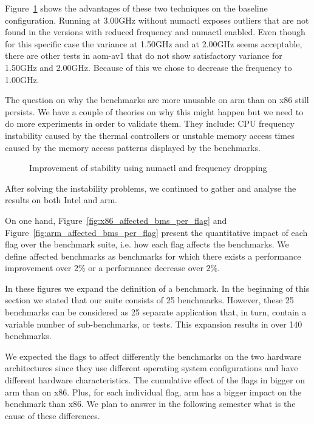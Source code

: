 Figure~\ref{fig:EncoderModeSpeed11RealtimeInputBosphorus4K} shows the advantages
of these two techniques on the baseline configuration. Running at 3.00GHz
without numactl exposes outliers that are not found in the versions with reduced
frequency and numactl enabled. Even though for this specific case the variance
at 1.50GHz and at 2.00GHz seems acceptable, there are other tests in aom-av1
that do not show satisfactory variance for 1.50GHz and 2.00GHz. Because of this
we chose to decrease the frequency to 1.00GHz.

The question on why the benchmarks are more unusable on arm than on x86 still
persists. We have a couple of theories on why this might happen but we need to
do more experiments in order to validate them. They include: CPU frequency
instability caused by the thermal controllers or unstable memory access times
caused by the memory access patterns displayed by the benchmarks. 

\begin{figure}[H]
  \centering
  
  \caption{Improvement of stability using numactl and frequency dropping}
  \label{fig:EncoderModeSpeed11RealtimeInputBosphorus4K}
\end{figure}

After solving the instability problems, we continued to gather and analyse the
results on both Intel and arm.

On one hand, Figure~\ref{fig:x86_affected_bms_per_flag} and
Figure~\ref{fig:arm_affected_bms_per_flag} present the quantitative impact of
each flag over the benchmark suite, i.e. how each flag affects the benchmarks.
We define affected benchmarks as benchmarks for which there exists a performance
improvement over 2\% or a performance decrease over 2\%.

In these figures we expand the definition of a benchmark. In the beginning of
this section we stated that our suite consists of 25 benchmarks. However, these
25 benchmarks can be considered as 25 separate application that, in turn,
contain a variable number of sub-benchmarks, or tests. This expansion results in
over 140 benchmarks.

We expected the flags to affect differently the benchmarks on the two hardware
architectures since they use different operating system configurations and have
different hardware characteristics. The cumulative effect of the flags in bigger
on arm than on x86. Plus, for each individual flag, arm has a bigger impact on
the benchmark than x86. We plan to answer in the following semester what is the
cause of these differences.

